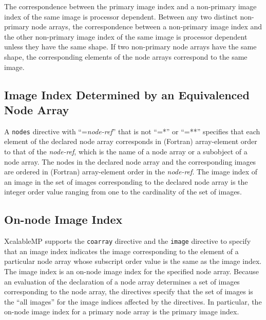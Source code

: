 The correspondence between the primary image index and a non-primary image
index of the same image is processor dependent.
Between any two distinct non-primary node arrays, 
the correspondence between a non-primary image index 
and the other non-primary image index of the same image is
processor dependent unless they have the same shape. 
If two non-primary node arrays have the same shape,
the corresponding elements of the node arrays correspond
to the same image.


%


\subsection{Image Index Determined by an Equivalenced Node Array}

A {\tt nodes} directive with ``={\it node-ref}'' that is not ``=*'' or
``=**''
specifies that
each element of the declared node array corresponds in (Fortran)
array-element order
to that of the {\it node-ref},
which is the name of a node array or a subobject of a node array.
The nodes in the declared node array and the corresponding images 
are ordered in (Fortran) array-element order in the {\it node-ref}.
The image index of an image in the set of images
corresponding to the declared node array
is the integer order value ranging from one to the cardinality of the
set of images.


\subsection{On-node Image Index}

XcalableMP supports the {\tt coarray} directive and the {\tt image}
directive to   %
specify that an image index indicates the image corresponding to
the element of a particular node array whose subscript order value is 
the same as the image index.
The image index is an on-node image index for the specified node array. 
Because an evaluation of the declaration of a node array 
determines a set of images corresponding to the node array,
the directives specify that the set of images 
is the ``all images'' for the image indices affected by the directives.
In particular, the on-node image index for a primary node array
is the primary image index. 


